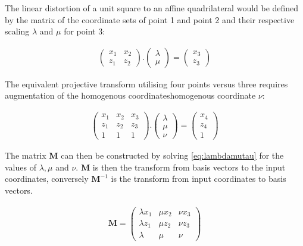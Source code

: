 The linear distortion of a unit square to an affine quadrilateral would be defined by the matrix of the coordinate sets of point 1 and point 2 and their respective scaling $\lambda$ and $\mu$ for point 3:

\begin{align}
\begin{pmatrix}
x_1 & x_2 \\
z_1 & z_2
\end{pmatrix}
.
\begin{pmatrix}
\lambda  \\
\mu
\end{pmatrix}
= \begin{pmatrix}
x_3  \\
z_3
\end{pmatrix}
\end{align}

The equivalent projective transform utilising four points versus three requires augmentation of the \gls{homogenous coordinates}{homogenous coordinate} $\nu$:

\begin{align}
\begin{pmatrix}
x_1 & x_2 & x_3 \\
z_1 & z_2 & z_3 \\
1 & 1 & 1
\end{pmatrix}
.
\begin{pmatrix}
\lambda  \\
\mu \\
\nu
\end{pmatrix}
= \begin{pmatrix}
x_4  \\
z_4 \\
1
\end{pmatrix} \label{eq:lambdamutau}
\end{align}

The matrix $\textbf{M}$ can then be constructed by solving \eqref{eq:lambdamutau} for the values of $\lambda, \mu $ and $\nu$.
$\textbf{M}$ is then the transform from basis vectors to the input coordinates, conversely ${\textbf{M}}^{-1}$ is the transform from input coordinates to basis vectors.

\begin{align}
\textbf{M} =
\begin{pmatrix}
\lambda x_1 & \mu x_2 & \nu x_3 \\
\lambda z_1 & \mu z_2 & \nu z_3 \\
\lambda & \mu & \nu
\end{pmatrix}
\end{align}

